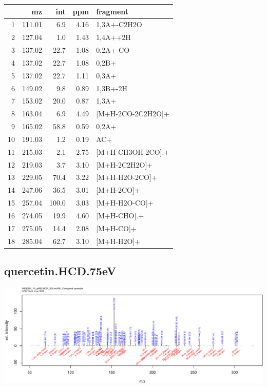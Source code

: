 \documentclass[]{article}
\begin{document}
\begin{table}[ht]
\centering
\begin{tabular}{rrrrl}
  \toprule
 & mz & int & ppm & fragment \\ 
  \midrule
1 & 111.01 & 6.9 & 4.16 & 1,3A+-C2H2O \\ 
  2 & 127.04 & 1.0 & 1.43 & 1,4A++2H \\ 
  3 & 137.02 & 22.7 & 1.08 & 0,2A+-CO \\ 
  4 & 137.02 & 22.7 & 1.08 & 0,2B+ \\ 
  5 & 137.02 & 22.7 & 1.11 & 0,3A+ \\ 
  6 & 149.02 & 9.8 & 0.89 & 1,3B+-2H \\ 
  7 & 153.02 & 20.0 & 0.87 & 1,3A+ \\ 
  8 & 163.04 & 6.9 & 4.49 & [M+H-2CO-2C2H2O]+ \\ 
  9 & 165.02 & 58.8 & 0.59 & 0,2A+ \\ 
  10 & 191.03 & 1.2 & 0.19 & AC+ \\ 
  11 & 215.03 & 2.1 & 2.75 & [M+H-CH3OH-2CO].+ \\ 
  12 & 219.03 & 3.7 & 3.10 & [M+H-2C2H2O]+ \\ 
  13 & 229.05 & 70.4 & 3.22 & [M+H-H2O-2CO]+ \\ 
  14 & 247.06 & 36.5 & 3.01 & [M+H-2CO]+ \\ 
  15 & 257.04 & 100.0 & 3.03 & [M+H-H2O-CO]+ \\ 
  16 & 274.05 & 19.9 & 4.60 & [M+H-CHO].+ \\ 
  17 & 275.05 & 14.4 & 2.08 & [M+H-CO]+ \\ 
  18 & 285.04 & 62.7 & 3.10 & [M+H-H2O]+ \\ 
   \bottomrule
\end{tabular}
\end{table}

\clearpage\subsection{quercetin.HCD.75eV}
\includegraphics[width=\textwidth]{WEB350_files/figure-latex/unnamed-chunk-3-29}
\end{document}
